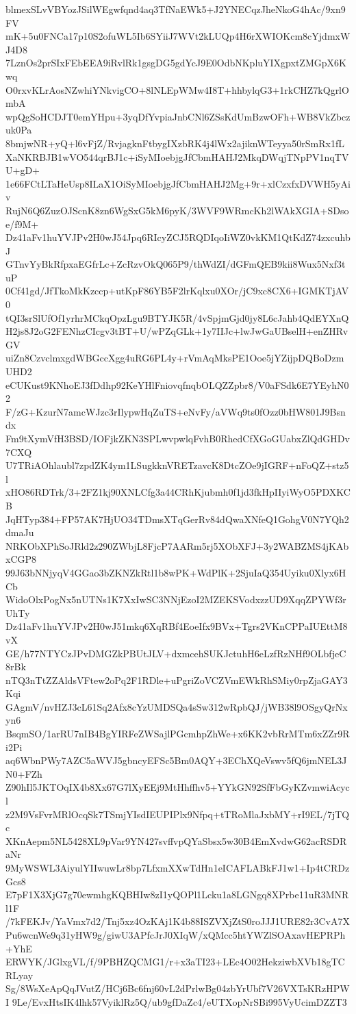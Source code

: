 blmexSLvVBYozJSilWEgwfqnd4aq3TfNaEWk5+J2YNECqzJheNkoG4hAc/9xn9FV
mK+5u0FNCa17p10S2ofuWL5Ib6SYiiJ7WVt2kLUQp4H6rXWIOKcm8cYjdmxWJ4D8
7LznOs2prSIxFEbEEA9iRvlRk1gsgDG5gdYcJ9E0OdbNKpluYIXgpxtZMGpX6Kwq
O0rxvKLrAosNZwhiYNkvigCO+8lNLEpWMw4I8T+hhbylqG3+1rkCHZ7kQgrlOmbA
wpQgSoHCDJT0emYHpu+3yqDfYvpiaJnbCNl6ZSsKdUmBzwOFh+WB8VkZbczuk0Pa
8bmjwNR+yQ+l6vFjZ/RvjagknFtbygIXzbRK4j4lWx2ajiknWTeyya50rSmRx1fL
XaNKRBJB1wVO544qrBJ1c+iSyMIoebjgJfCbmHAHJ2MkqDWqjTNpPV1nqTVU+gD+
1e66FCtLTaHeUsp8ILaX1OiSyMIoebjgJfCbmHAHJ2Mg+9r+xlCzxfxDVWH5yAiv
RujN6Q6ZuzOJScnK8zn6WgSxG5kM6pyK/3WVF9WRmcKh2lWAkXGIA+SDsoe/f9M+
Dz41aFv1huYVJPv2H0wJ54Jpq6RIcyZCJ5RQDIqoIiWZ0vkKM1QtKdZ74zxcuhbJ
GTnvYyBkRfpxaEGfrLc+ZcRzvOkQ065P9/thWdZI/dGFmQEB9kii8Wux5Nxf3tuP
0Cf41gd/JfTkoMkKzccp+utKpF86YB5F2lrKqlxu0XOr/jC9xc8CX6+IGMKTjAV0
tQI3srSlUfOf1yrhrMCkqOpzLgu9BTYJK5R/4vSpjmGjd0jy8L6cJahb4QdEYXnQ
H2js8J2oG2FENhzCIcgv3tBT+U/wPZqGLk+1y7IIJc+lwJwGaUBselH+enZHRvGV
uiZn8CzvclmxgdWBGccXgg4uRG6PL4y+rVmAqMksPE1Ooe5jYZijpDQBoDzmUHD2
eCUKust9KNhoEJ3fDdhp92KeYHlFniovqfnqbOLQZZpbr8/V0aFSdk6E7YEyhN02
F/zG+KzurN7amcWJzc3rIlypwHqZuTS+eNvFy/aVWq9ts0fOzz0bHW801J9Bsndx
Fm9tXymVfH3BSD/IOFjkZKN3SPLwvpwlqFvhB0RhedCfXGoGUabxZlQdGHDv7CXQ
U7TRiAOhlaubl7zpdZK4ym1LSugkknVRETzavcK8DtcZOe9jIGRF+nFoQZ+stz5l
xHO86RDTrk/3+2FZ1kj90XNLCfg3a44CRhKjubmh0f1jd3fkHpIIyiWyO5PDXKCB
JqHTyp384+FP57AK7HjUO34TDmsXTqGerRv84dQwaXNfeQ1GohgV0N7YQh2dmaJu
NRKObXPhSoJRld2z290ZWbjL8FjcP7AARm5rj5XObXFJ+3y2WABZMS4jKAbxCGP8
99J63bNNjyqV4GGao3bZKNZkRtl1b8wPK+WdPlK+2SjuIaQ354Uyiku0Xlyx6HCb
WidoOlxPogNx5nUTNs1K7XxIwSC3NNjEzoI2MZEKSVodxzzUD9XqqZPYWf3rUhTy
Dz41aFv1huYVJPv2H0wJ51mkq6XqRBf4EoeIfx9BVx+Tgrs2VKnCPPaIUEttM8vX
GE/h77NTYCzJPvDMGZkPBUtJLV+dxmcehSUKJctuhH6eLzfRzNHf9OLbfjeC8rBk
nTQ3nTtZZAldsVFtew2oPq2F1RDle+uPgriZoVCZVmEWkRhSMiy0rpZjaGAY3Kqi
GAgmV/nvHZJ3cL61Sq2Afx8cYzUMDSQa4sSw312wRpbQJ/jWB38l9OSgyQrNxyn6
BsqmSO/1arRU7nIB4BgYIRFeZWSajlPGcmhpZhWe+x6KK2vbRrMTm6xZZr9Ri2Pi
aq6WbnPWy7AZC5aWVJ5gbncyEFSc5Bm0AQY+3EChXQeVswv5fQ6jmNEL3JN0+FZh
Z90hIl5JKTOqIX4b8Xx67G7lXyEEj9MtHhffhv5+YYkGN92SfFbGyKZvmwiAcycl
z2M9VsFvrMRlOcqSk7TSmjYIsdIEUPIPlx9Nfpq+tTRoMlaJxbMY+rI9EL/7jTQc
XKnAepm5NL5428XL9pVar9YN427svffvpQYaSbsx5w30B4EmXvdwG62acRSDRaNr
9MyWSWL3AiyulYIIwuwLr8bp7LfxmXXwTdHn1eICAFLABkFJ1w1+Ip4tCRDzGcs8
E7pF1X3XjG7g70ewmhgKQBHIw8zI1yQOPl1Lcku1a8LGNgq8XPrbe11uR3MNRl1F
/7kFEKJv/YaVmx7d2/Tnj5xz4OzKAj1K4b88ISZVXjZtS0roJJJ1URE82r3CvA7X
Pu6wcnWe9q31yHW9g/giwU3APfcJrJ0XIqW/xQMcc5htYWZlSOAxavHEPRPh+YhE
ERWYK/JGlxgVL/f/9PBHZQCMG1/r+x3aTI23+LEc4O02HekziwbXVb18gTCRLyay
Sg/8WsXeApQqJVutZ/HCj6Bc6fnj60vL2dPrlwBg04zbYrUbf7V26VXTsKRzHPWI
9Le/EvxHtsIK4lhk57VyiklRz5Q/ub9gfDaZc4/eUTXopNrSBi995VyUcimDZZT3
